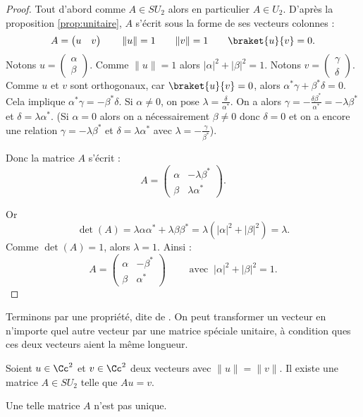 \documentclass[11pt,class=report,crop=false]{standalone}
\begin{document}
\begin{proof}
Tout d'abord comme $A \in SU_2$ alors en particulier $A \in U_2$.
D'après la proposition \ref{prop:unitaire},
$A$ s'écrit sous la forme de ses vecteurs colonnes :
$$A = \begin{pmatrix}u & v\end{pmatrix}\qquad
\|u\|=1 \qquad \|v\|=1 \qquad \braket{u}{v} = 0.$$
Notons $u = \begin{pmatrix}\alpha\\\beta\end{pmatrix}$. 
Comme $\|u\|=1$ alors $|\alpha|^2 + |\beta|^2 = 1$.
Notons $v = \begin{pmatrix}\gamma\\\delta\end{pmatrix}$. 
Comme $u$ et $v$ sont orthogonaux, car $\braket{u}{v} = 0$,
alors $\alpha^* \gamma + \beta^*\delta=0$.
Cela implique $\alpha^* \gamma = -\beta^*\delta$.
Si $\alpha\neq0$, on pose $\lambda = \frac{\delta}{\alpha^*}$. 
On a alors $\gamma = - \frac{\delta\beta^*}{\alpha^*} = - \lambda \beta^*$ et $\delta = \lambda \alpha^*$. (Si $\alpha = 0$ alors on a nécessairement $\beta\neq0$ donc $\delta=0$ et on a encore une relation $\gamma = - \lambda \beta^*$ et $\delta = \lambda \alpha^*$ avec $\lambda = - \frac{\gamma}{\beta^*}$).

Donc la matrice $A$ s'écrit :
$$A = \begin{pmatrix}\alpha&-\lambda\beta^*\\\beta&\lambda\alpha^*\end{pmatrix}.$$

Or 
$$\det(A) = \lambda \alpha\alpha^* + \lambda\beta\beta^*
= \lambda ( |\alpha|^2 + |\beta|^2 ) = \lambda.$$
Comme $\det(A)=1$, alors $\lambda=1$.
Ainsi :
$$A = \begin{pmatrix}\alpha&-\beta^*\\\beta&\alpha^*\end{pmatrix}
\qquad \text{ avec }  \ |\alpha|^2 + |\beta|^2 = 1.$$
\end{proof}






Terminons par une propriété, dite de . On peut transformer un vecteur en n'importe quel autre vecteur par une matrice spéciale unitaire, à condition ques ces deux vecteurs aient la même longueur.
\begin{proposition}
Soient $u \in \Cc^2$ et $v \in \Cc^2$ deux vecteurs avec $\|u\|=\|v\|$.
Il existe une matrice $A \in SU_2$ telle que $Au=v$.
\end{proposition}
Une telle matrice $A$ n'est pas unique.
\end{document}

